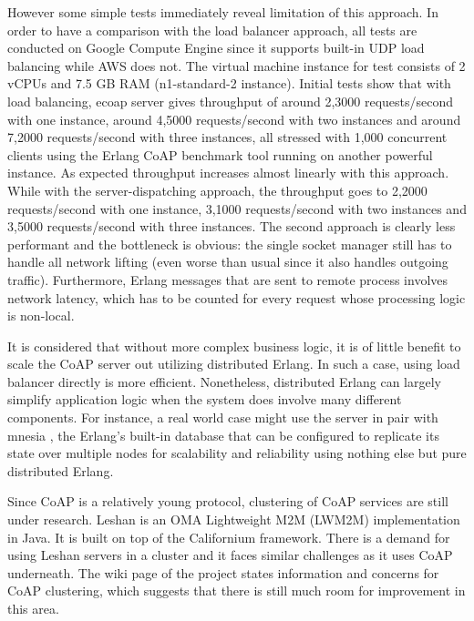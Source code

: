 However some simple tests immediately reveal limitation of this approach. In order to have a comparison with the load balancer approach, all tests are conducted on Google Compute Engine \autocite{google_compute_engine} since it supports built-in UDP load balancing while AWS does not. The virtual machine instance for test consists of 2 vCPUs and 7.5 GB RAM (n1-standard-2 instance). Initial tests show that with load balancing, ecoap server gives throughput of around 2,3000 requests/second with one instance, around 4,5000 requests/second with two instances and around 7,2000 requests/second with three instances, all stressed with 1,000 concurrent clients using the Erlang CoAP benchmark tool running on another powerful instance. As expected throughput increases almost linearly with this approach. While with the server-dispatching approach, the throughput goes to 2,2000 requests/second with one instance, 3,1000 requests/second with two instances and 3,5000 requests/second with three instances. The second approach is clearly less performant and the bottleneck is obvious: the single socket manager still has to handle all network lifting (even worse than usual since it also handles outgoing traffic). Furthermore, Erlang messages that are sent to remote process involves network latency, which has to be counted for every request whose processing logic is non-local.

It is considered that without more complex business logic, it is of little benefit to scale the CoAP server out utilizing distributed Erlang. In such a case, using load balancer directly is more efficient. Nonetheless, distributed Erlang can largely simplify application logic when the system does involve many different components. For instance, a real world case might use the server in pair with mnesia \autocite{mnesia}, the Erlang's built-in database that can be configured to replicate its state over multiple nodes for scalability and reliability using nothing else but pure distributed Erlang. 

Since CoAP is a relatively young protocol, clustering of CoAP services are still under research. Leshan \autocite{leshan} is an OMA Lightweight M2M (LWM2M) implementation in Java. It is built on top of the Californium framework. There is a demand for using Leshan servers in a cluster and it faces similar challenges as it uses CoAP underneath. The wiki page of the project \autocite{leshan_cluster} states information and concerns for CoAP clustering, which suggests that there is still much room for improvement in this area.

